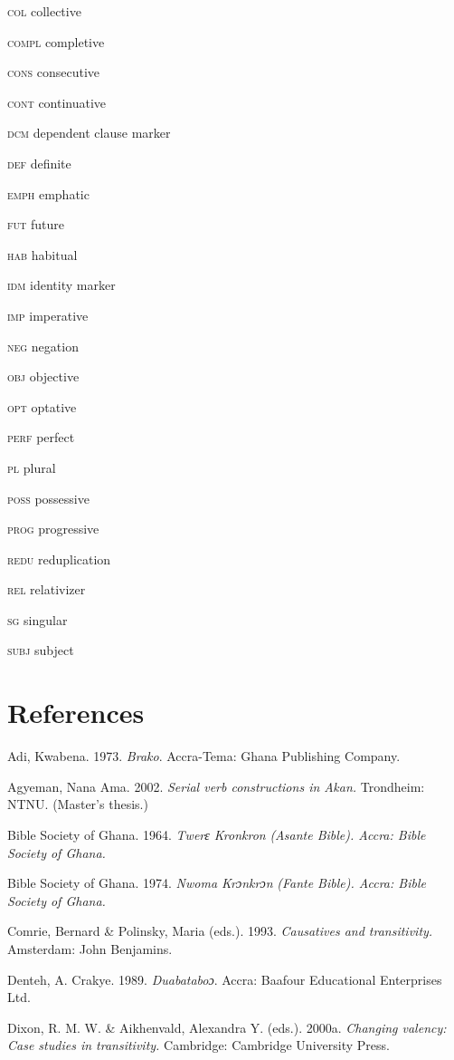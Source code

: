 \documentclass[output=paper]{langsci/langscibook}
\begin{document}
\textsc{col}   collective

\textsc{compl}  completive

\textsc{cons}  consecutive

\textsc{cont}  continuative

\textsc{dcm}   dependent clause marker

\textsc{def}   definite

\textsc{emph}  emphatic

\textsc{fut}  future

\textsc{hab}  habitual

\textsc{idm}  identity marker

\textsc{imp}  imperative

\textsc{neg}  negation

\textsc{obj}  objective

\textsc{opt}  optative

\textsc{perf}  perfect

\textsc{pl}  plural

\textsc{poss}  possessive

\textsc{prog}  progressive

\textsc{redu}  reduplication

\textsc{rel  }relativizer

\textsc{sg  }singular

\textsc{subj  }subject

\chapter{References}

Adi, Kwabena. 1973. \emph{Brako}. Accra-Tema: Ghana Publishing Company.

Agyeman, Nana Ama. 2002. \emph{Serial verb constructions in Akan.} Trondheim: NTNU. (Master’s thesis.)

Bible Society of Ghana. 1964. \emph{Twerɛ Kronkron}\emph{\textup{ (}}\emph{Asante Bible}\emph{\textup{). Accra: Bible Society of Ghana.}}

Bible Society of Ghana. 1974. \emph{Nwoma Krɔnkrɔn}\emph{\textup{ (}}\emph{Fante Bible}\emph{\textup{). Accra: Bible Society of Ghana.}}

Comrie, Bernard \& Polinsky, Maria (eds.). 1993. \textit{Causatives and transitivity.} Amsterdam: John Benjamins.

Denteh, A. Crakye. 1989. \emph{Duabataboɔ}. Accra: Baafour Educational Enterprises Ltd.

Dixon, R. M. W. \& Aikhenvald, Alexandra Y. (eds.). 2000a. \textit{Changing valency: Case studies in transitivity.} Cambridge: Cambridge University Press.
\end{document}
